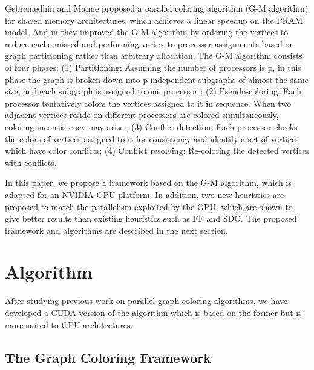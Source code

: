 \documentclass[preprint]{sigplanconf}
\begin{document}
Gebremedhin and Manne proposed a  parallel coloring algorithm (G-M algorithm) for shared memory architectures, which achieves a linear speedup on the PRAM model \cite{gebremedhin2000scalable} .And in \cite{gebremedhin2006speeding} they improved the G-M algorithm by ordering the vertices to reduce cache missed and performing vertex to processor assignments based on graph partitioning rather than arbitrary allocation. The G-M algorithm consists of four phases: (1) Partitioning: Assuming the number of processors is p, in this phase the graph is broken down into p independent subgraphs of almost the same size, and each subgraph is assigned to one processor ; (2) Pseudo-coloring: Each processor tentatively colors the vertices assigned to it in sequence. When two adjacent vertices reside on different processors are colored simultaneously, coloring inconsistency may arise.; (3) Conflict detection:  Each processor checks the colors of  vertices assigned to it for consistency and identify a set of vertices which have color conflicts; (4) Conflict resolving: Re-coloring the detected vertices with conflicts.

In this paper, we propose a framework based on the G-M algorithm, which is adapted for an NVIDIA GPU platform.  In addition, two new heuristics are proposed to match the parallelism exploited by the GPU, which are shown to give better results than existing heuristics such as FF and SDO. The proposed framework and algorithms are described in the next section.


\section{Algorithm}

After studying previous work on parallel graph-coloring algorithms, we have developed a CUDA version of the algorithm which is based on the former but is more suited to GPU architectures.

\subsection{The Graph Coloring Framework}

\begin{algorithm}
\begin{algorithmic}
\newline
	
		\newline
	\ENDWHILE
	

		
\end{algorithmic}\
\end{algorithm}
\end{document}
